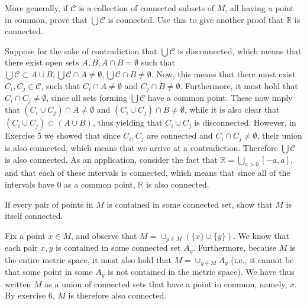 \begin{exercise}{6}
    More generally, if $\mathcal{C}$ is a collection of connected subsets of $M$, all having a point in common, prove that $\bigcup \mathcal{C}$ is connected.
    Use this to give another proof that $\mathbb{R}$ is connected.
\end{exercise}

\begin{solution}
    
    Suppose for the sake of contradiction that $\bigcup \mathcal{C}$ is disconnected, which means that there exist open sets $A, B, A \cap B = \emptyset$ such that $\bigcup \mathcal{C} \subset A \cup B, \bigcup \mathcal{C} \cap A \neq \emptyset, \bigcup \mathcal{C} \cap B \neq \emptyset$.
    Now, this means that there must exist $C_i, C_j \in \mathcal{C}$, such that $C_i \cap A \neq \emptyset$ and $C_j \cap B \neq \emptyset$.
    Furthermore, it must hold that $C_i \cap C_j \neq \emptyset$, since all sets forming $\bigcup \mathcal{C}$ have a common point.
    These now imply that $(C_i \cup C_j) \cap A \neq \emptyset$ and $(C_i \cup C_j) \cap B \neq \emptyset$, while it is also clear that $(C_i \cup C_j) \subset (A \cup B)$, thus yielding that $C_i \cup C_j$ is disconnected.
    However, in Exercise 5 we showed that since $C_i, C_j$ are connected and $C_i \cap C_j \neq \emptyset$, their union is also connected, which means that we arrive at a contradiction.
    Therefore $\bigcup \mathcal{C}$ is also connected.
    As an application, consider the fact that $\mathbb{R} = \bigcup_{a > 0} [-a, a]$, and that each of these intervals is connected, which means that since all of the intervals have 0 as a common point, $\mathbb{R}$ is also connected.

\end{solution}

\begin{exercise}{7}
    If every pair of points in $M$ is contained in some connected set, show that $M$ is itself connected.
\end{exercise}

\begin{solution}
    
    Fix a point $x \in M$, and observe that $M = \cup_{y \in M} (\{x\} \cup \{y\})$.
    We know that each pair $x, y$ is contained in some connected set $A_y$.
    Furthermore, because $M$ is the entire metric space, it must also hold that $M = \cup_{y \in M} A_y$ (i.e., it cannot be that some point in some $A_y$ is not contained in the metric space).
    We have thus written $M$ as a union of connected sets that have a point in common, namely, $x$.
    By exercise 6, $M$ is therefore also connected.
\end{solution}

